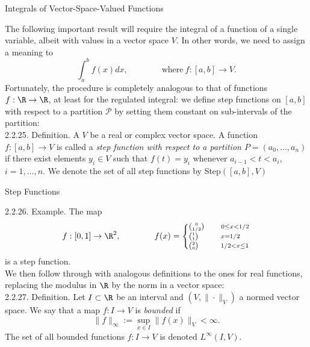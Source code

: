\documentclass[smaller,hyperref={CJKbookmarks=true}]{beamer}
\begin{document}
\begin{frame}[t]{Integrals of Vector-Space-Valued Functions}
\begin{spacing}{1}
The following important result will require the integral of a function of a
single variable, albeit with values in a vector space $V$. In other words, we
need to assign a meaning to
\[\int_{a}^{b}f(x)dx,\qquad\qquad\text{where}~f:[a,b]\to V.\]
Fortunately, the procedure is completely analogous to that of functions $f:\R\to\R$, at least for the regulated integral: we define step functions on $[a,b]$ with respect to a partition $\mathcal{P}$ by setting them constant on sub-intervals of the partition:\\[14pt]
\alert{2.2.25. Definition.} A $V$ be a real or complex vector space. A function $f:[a,b]\to V$ is called a \emph{step function with respect to a partition $P=(a_0,\ldots,a_n)$} if there exist elements $y_i\in V$ such that $f(t)=y_i$ whenever $a_{i-1}<t<a_i$,\\$i=1,\ldots,n$. We denote the set of all step functions by Step$([a,b],V)$
\end{spacing}
\end{frame}
\begin{frame}[t]{Step Functions}
\begin{spacing}{1}
\alert{2.2.26. Example.} The map
\begin{equation*}
  f:[0,1]\to\R^2,\qquad\qquad f(x)=\left\{\begin{subarray}
  ~\binom{0}{1/2}\qquad 0\leq x<1/2\\
  \binom{1}{1}\qquad ~~x=1/2\\
  \binom{2}{0}\qquad ~~1/2<x\leq 1
            \end{subarray}\right.
\end{equation*}
is a step function.\\[5pt]
We then follow through with analogous definitions to the ones for real
functions, replacing the modulus in $\R$ by the norm in a vector space:\\[5pt]
\alert{2.2.27. Definition.} Let $I\subset\R$ be an interval and $(V,\|\cdot\|_V)$ a normed vector space. We say that a map $f:I\to V$ is \emph{bounded} if
\begin{equation}\label{2.2.5}
  \|f\|_{\infty}:=\sup\limits_{x\in I}\|f(x)\|_V<\infty.
\end{equation}
The set of all bounded functions $f:I\to V$ is denoted $L^{\infty}(I,V)$.
\end{spacing}
\end{frame}
\end{document}
